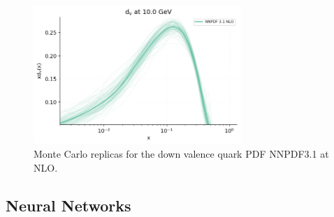 \begin{figure}
\centering
    \includegraphics[width=0.7\textwidth]{background/Qs0_NNPDF31NLO_plot_pdfreplicas_d_v.png}
\caption{Monte Carlo replicas for the down valence quark PDF NNPDF3.1 at NLO. } \label{fig:replicas}
\end{figure}

\subsection{Neural Networks}

